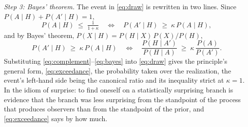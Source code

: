 \textit{Step 3: Bayes' theorem.} The event in \eqref{eq:draw} is rewritten in two lines. Since $P(A \mid H) + P(A' \mid H) = 1$,
\begin{equation}
\label{eq:complement}
P(A \mid H) \;\le\; \tfrac{1}{1+\kappa} \quad\Longleftrightarrow\quad P(A' \mid H) \;\ge\; \kappa\, P(A \mid H),
\end{equation}
and by Bayes' theorem, $P(X \mid H) = P(H \mid X)\,P(X)/P(H)$,
\begin{equation}
\label{eq:bayes}
P(A' \mid H) \;\ge\; \kappa\, P(A \mid H) \quad\Longleftrightarrow\quad \frac{P(H \mid A')}{P(H \mid A)} \;\ge\; \kappa\, \frac{P(A)}{P(A')}.
\end{equation}
Substituting \eqref{eq:complement}--\eqref{eq:bayes} into \eqref{eq:draw} gives the principle's general form, \eqref{eq:exceedance}, the probability taken over the realization, the event's left-hand side being the canonical ratio and its inequality strict at $\kappa = 1$. In the idiom of surprise: to find oneself on a statistically surprising branch is evidence that the branch was less surprising from the standpoint of the process that produces observers than from the standpoint of the prior, and \eqref{eq:exceedance} says by how much.

